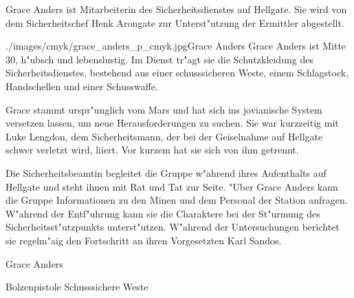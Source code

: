 
Grace Anders ist Mitarbeiterin des Sicherheitsdienstes auf Hellgate. Sie wird von dem Sicherheitschef Henk Arongate zur Unterst"utzung der Ermittler abgestellt.

\begin{sideimagebox}[l]{0.5}{./images/cmyk/grace_anders_p_cmyk.jpg}{Grace Anders}
    Grace Anders ist Mitte 30, h"ubsch und lebenslustig. Im Dienst tr"agt sie die Schutzkleidung des Sicherheitsdienstes, bestehend aus einer schusssicheren Weste, einem Schlagstock, Handschellen und einer Schusswaffe.

    Grace stammt urspr"unglich vom Mars und hat sich ins jovianische System versetzen lassen, um neue Herausforderungen zu suchen. Sie war kurzzeitig mit Luke Lengdon, dem Sicherheitsmann, der bei der Geiselnahme auf Hellgate schwer verletzt wird, liiert. Vor kurzem hat sie sich von ihm getrennt.
    
    Die Sicherheitsbeamtin begleitet die Gruppe w"ahrend ihres Aufenthalts auf Hellgate und steht ihnen mit Rat und Tat zur Seite. "Uber Grace Anders kann die Gruppe Informationen zu den Minen und dem Personal der Station anfragen. W"ahrend der Entf"uhrung kann sie die Charaktere bei der St"urmung des Sicherheitsst"utzpunkts unterst"utzen. W"ahrend der Untersuchungen berichtet sie regelm"a\3ig den Fortschritt an ihren Vorgesetzten Karl Sandos.
\end{sideimagebox}

\begin{nscsheet}{Grace Anders}
    \nscstats[ATT=2,AGG=2,COM=2]
    \nscruler
    \begin{nscinventory}
        \nscitem[Waffen] Bolzenpistole
        \nscitem[R"ustung] Schusssichere Weste
    \end{nscinventory}
\end{nscsheet}

